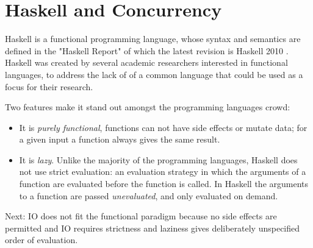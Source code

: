 
\chapter{Haskell and Concurrency}

Haskell is a functional programming language, whose syntax and semantics are defined in the "Haskell Report" of which the latest revision is Haskell 2010 \cite{Marlow_haskell2010}. Haskell was created by several academic researchers interested in functional languages, to address the lack of of a common language that could be used as a focus for their research.

Two features make it stand out amongst the programming languages crowd:
\begin{itemize}
\item It is \emph{purely functional}, \ie functions can not have side effects or mutate data; for a given input a function always gives the same result.
\item It is \emph{lazy}. Unlike the majority of the programming languages, Haskell does not use strict evaluation: an evaluation strategy in which the arguments of a function are evaluated before the function is called. In Haskell the arguments to a function are passed \emph{unevaluated}, and only evaluated on demand.
\end{itemize}

Next: IO does not fit the functional paradigm because no side effects are permitted and IO requires strictness and laziness gives deliberately unspecified order of evaluation. \cite{PeytonJones:1993:IFP:158511.158524} 






